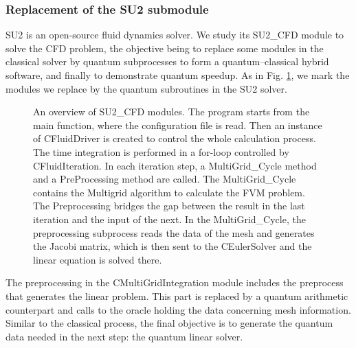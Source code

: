 \documentclass[%
 reprint,
 amsmath,amssymb,
pra,
]{revtex4-1}
\begin{document}
\subsubsection{Replacement of the SU2 submodule}

SU2 is an open-source fluid dynamics solver. We study its SU2\_CFD module to solve the CFD problem, the objective being to replace some modules in the classical solver by quantum subprocesses to form a quantum--classical hybrid software, and finally to demonstrate quantum speedup. As in Fig. \ref{SU2modules}, we mark the modules we replace by the quantum subroutines in the SU2 solver.

\begin{figure}[htbp]
     \caption{An overview of SU2\_CFD modules. The program starts from the main function, where the configuration file is read. Then an instance of CFluidDriver is created to control the whole calculation process. The time integration is performed in a for-loop controlled by CFluidIteration. In each iteration step, a MultiGrid\_Cycle method and a PreProcessing method are called. The MultiGrid\_Cycle contains the Multigrid algorithm to calculate the FVM problem. The Preprocessing bridges the gap between the result in the last iteration and the input of the next. In the MultiGrid\_Cycle, the preprocessing subprocess reads the data of the mesh and generates the Jacobi matrix, which is then sent to the CEulerSolver and the linear equation is solved there.}
    \label{SU2modules}
\end{figure}

The preprocessing in the CMultiGridIntegration module includes the preprocess that generates the linear problem. This part is replaced by a quantum arithmetic counterpart and calls to the oracle holding the data concerning mesh information. Similar to the classical process, the final objective is to generate the quantum data needed in the next step: the quantum linear solver.
\end{document}
